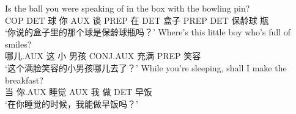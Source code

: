 \eal
\label{aux-fronting-childes}
\ex 
\gll Is the ball you were speaking of in the box with the bowling pin?\\
COP DET 球 你 AUX 谈 PREP 在 DET 盒子 PREP DET 保龄球 瓶\\
\glt `你说的盒子里的那个球是保龄球瓶吗？'
\ex 
\gll Where's this little boy who's full of smiles?\\
哪儿.AUX 这 小 男孩 CONJ.AUX 充满 PREP 笑容\\
\glt `这个满脸笑容的小男孩哪儿去了？'
\ex\label{aux-fronting-Adjunktsatz} 
\gll While you're sleeping, shall I make the breakfast?\\
当 你.AUX 睡觉 AUX 我 做 DET 早饭\\
\glt `在你睡觉的时候，我能做早饭吗？'
\zl


